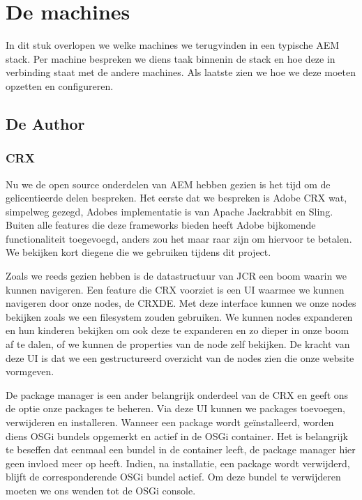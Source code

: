 
	\section{De machines}
	In dit stuk overlopen we welke machines we terugvinden in een typische AEM stack. Per machine bespreken we diens taak binnenin de stack en hoe deze in verbinding staat met de andere machines. Als laatste zien we hoe we deze moeten opzetten en configureren.
	\subsection{De Author}
	\subsubsection{CRX}
	Nu we de open source onderdelen van AEM hebben gezien is het tijd om de gelicentieerde delen bespreken. Het eerste dat we bespreken is Adobe CRX wat, simpelweg gezegd, Adobes implementatie is van Apache Jackrabbit en Sling. Buiten alle features die deze frameworks bieden heeft Adobe bijkomende functionaliteit toegevoegd, anders zou het maar raar zijn om hiervoor te betalen. We bekijken kort diegene die we gebruiken tijdens dit project.
	\par
	Zoals we reeds gezien hebben is de datastructuur van JCR een boom waarin we kunnen navigeren. Een feature die CRX voorziet is een UI waarmee we kunnen navigeren door onze nodes, de CRXDE. Met deze interface kunnen we onze nodes bekijken zoals we een filesystem zouden gebruiken. We kunnen nodes expanderen en hun kinderen bekijken om ook deze te expanderen en zo dieper in onze boom af te dalen, of we kunnen de properties van de node zelf bekijken. De kracht van deze UI is dat we een gestructureerd overzicht van de nodes zien die onze website vormgeven.
	\par
	De package manager is een ander belangrijk onderdeel van de CRX en geeft ons de optie onze packages te beheren. Via deze UI kunnen we packages toevoegen, verwijderen en installeren. Wanneer een package wordt geïnstalleerd, worden diens OSGi bundels opgemerkt en actief in de OSGi container. Het is belangrijk te beseffen dat eenmaal een bundel in de container leeft, de package manager hier geen invloed meer op heeft. Indien, na installatie, een package wordt verwijderd, blijft de corresponderende OSGi bundel actief. Om deze bundel te verwijderen moeten we ons wenden tot de OSGi console.

